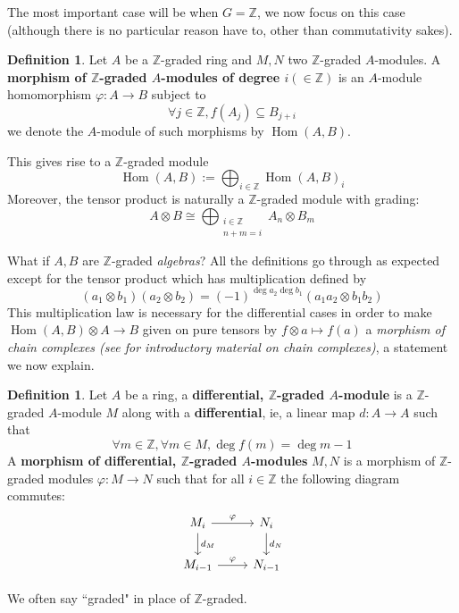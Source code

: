 \documentclass[12pt]{article}
\theoremstyle{plain}
\theoremstyle{definition}
\newtheorem{defn}[thm]{Definition} %
\newcommand{\bb}[1]{\mathbb{#1}}
\newcommand{\lto}{\longrightarrow}
\begin{document}
	The most important case will be when $G = \bb{Z}$, we now focus on this case (although there is no particular reason have to, other than commutativity sakes).
	\begin{defn}
		Let $A$ be a $\bb{Z}$-graded ring and $M,N$ two $\bb{Z}$-graded $A$-modules. A \textbf{morphism of $\bb{Z}$-graded $A$-modules of degree $i (\in \bb{Z})$} is an $A$-module homomorphism $\varphi: A \lto B$ subject to
		\begin{equation}
			\forall j \in \bb{Z}, f(A_j) \subseteq B_{j + i}
		\end{equation}
		we denote the $A$-module of such morphisms by $\operatorname{Hom}(A,B)$.
		
		This gives rise to a $\bb{Z}$-graded module
		\begin{equation}
			\operatorname{Hom}(A,B) := \bigoplus_{i \in \bb{Z}}\operatorname{Hom}(A,B)_i
		\end{equation}
		Moreover, the tensor product is naturally a $\bb{Z}$-graded module with grading:
		\begin{equation}
			A \otimes B \cong \bigoplus_{\substack{i \in \bb{Z}\\ n + m = i}}A_n \otimes B_m
		\end{equation}
	\end{defn}
	What if $A,B$ are $\bb{Z}$-graded \emph{algebras}? All the definitions go through as expected except for the tensor product which has multiplication defined by
	\begin{equation}\label{eq:tensor}
		(a_1 \otimes b_1)(a_2 \otimes b_2) = (-1)^{\operatorname{deg}a_2\operatorname{deg}b_1}(a_1a_2 \otimes b_1b_2)
	\end{equation}
	This multiplication law is necessary for the differential cases in order to make $\operatorname{Hom}(A,B) \otimes A \lto B$ given on pure tensors by $f \otimes a \longmapsto f(a)$ a \emph{morphism of chain complexes (see \cite{intro_hom_alg} for introductory material on chain complexes)}, a statement we now explain.
	\begin{defn}\label{def:diff_graded}
		Let $A$ be a ring, a \textbf{differential, $\bb{Z}$-graded $A$-module} is a $\bb{Z}$-graded $A$-module $M$ along with a \textbf{differential}, ie, a linear map $d: A \lto A$ such that
		\begin{equation}
			\forall m \in \bb{Z}, \forall m \in M, \operatorname{deg}f(m) = \operatorname{deg}m - 1
		\end{equation}
		A \textbf{morphism of differential, $\bb{Z}$-graded $A$-modules} $M,N$ is a morphism of $\bb{Z}$-graded modules $\varphi: M \lto N$ such that for all $i \in \bb{Z}$
		the following diagram commutes:
		\begin{equation}
			\begin{tikzcd}
				M_i\arrow[r, "\varphi"]\arrow[d,"{d_M}"] & N_i\arrow[d,"{d_N}"]\\
				M_{i - 1}\arrow[r,"{\varphi}"] & N_{i - 1}
			\end{tikzcd}
		\end{equation}
	\end{defn}
	We often say ``graded" in place of $\bb{Z}$-graded.
	
\end{document}
